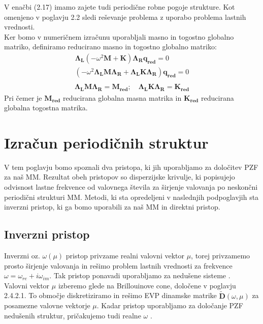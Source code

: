 \documentclass[12pt]{report}
\begin{document}
V enačbi (2.17) imamo zajete tudi periodične robne pogoje strukture. Kot omenjeno v poglavju 2.2 sledi reševanje problema z uporabo problema
lastnih vrednosti.
\\
Ker bomo v numeričnem izračunu uporabljali masno in togostno globalno matriko, definiramo reducirano masno in togostno globalno matriko:
\begin{equation*}
  \begin{aligned}
    \mathbf{\Lambda_L} (-\omega^2 \mathbf{M} + \mathbf{K})\mathbf{\Lambda_R q_{red}} = 0 \\
    (-\omega^2 \mathbf{\Lambda_L} \mathbf{M} \mathbf{\Lambda_R}  + \mathbf{\Lambda_L} \mathbf{K} \mathbf{\Lambda_R}) \mathbf{q_{red}} = 0 \\
  \end{aligned}
\end{equation*}
\begin{equation}
  \begin{aligned}
    \mathbf{\Lambda_L} \mathbf{M} \mathbf{\Lambda_R} = \mathbf{M_{red}}; \quad 
    \mathbf{\Lambda_L} \mathbf{K} \mathbf{\Lambda_R} = \mathbf{K_{red}}
  \end{aligned}
\end{equation}
\noindent Pri čemer je $\mathbf{M_{red}}$ reducirana globalna masna matrika in  $\mathbf{K_{red}}$ reducirana globalna togostna matrika.

\section{Izračun periodičnih struktur}
V tem poglavju bomo spoznali dva pristopa, ki jih uporabljamo za določitev \ac{PZF} za naš \ac{MM}. Rezultat obeh pristopov so disperzijske krivulje, ki popisujejo odvisnost lastne frekvence od valovnega števila 
za širjenje valovanja po neskončni periodični strukturi \ac{MM}. Metodi, ki sta opredeljeni v naslednjih podpoglavjih sta inverzni pristop, ki ga bomo uporabili za naš \ac{MM} in direktni pristop.

\subsection{Inverzni pristop}
Inverzni oz. $\omega(\mu)$ pristop privzame realni valovni vektor $\mu$, torej privzamemo prosto širjenje valovanja in rešimo problem lastnih vrednosti za frekvence $\omega = \omega_{re} + i\omega_{im}$. Tak pristop ponavadi 
uporabljamo za nedušene sisteme \cite{vanbelle}. \\
Valovni vektor $\mu$ izberemo glede na Brillouinove cone, določene v poglavju 2.4.2.1. To območje diskretiziramo in rešimo \ac{EVP} dinamske matrike $\mathbf{\widetilde{D}}(\omega, \mu)$ za posamezne valovne vektorje $\mu$.
Kadar pristop uporabljamo za določanje \ac{PZF} nedušenih struktur, pričakujemo tudi realne $\omega$ \cite{kosir}.
\end{document}
